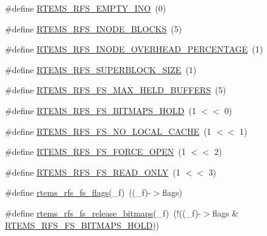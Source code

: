 \begin{DoxyCompactItemize}
\item 
\#define \mbox{\hyperlink{rtems-rfs-file-system_8h_a957363cf7a6021ba9f30143f5651c017}{R\+T\+E\+M\+S\+\_\+\+R\+F\+S\+\_\+\+E\+M\+P\+T\+Y\+\_\+\+I\+NO}}~(0)
\item 
\#define \mbox{\hyperlink{rtems-rfs-file-system_8h_a89ff31e716c58b51c65d688662acb012}{R\+T\+E\+M\+S\+\_\+\+R\+F\+S\+\_\+\+I\+N\+O\+D\+E\+\_\+\+B\+L\+O\+C\+KS}}~(5)
\item 
\#define \mbox{\hyperlink{rtems-rfs-file-system_8h_a2bb882abaa5cc3e88d60021646724e90}{R\+T\+E\+M\+S\+\_\+\+R\+F\+S\+\_\+\+I\+N\+O\+D\+E\+\_\+\+O\+V\+E\+R\+H\+E\+A\+D\+\_\+\+P\+E\+R\+C\+E\+N\+T\+A\+GE}}~(1)
\item 
\#define \mbox{\hyperlink{rtems-rfs-file-system_8h_a38fda827e3791d6dd1abab5f3a337f51}{R\+T\+E\+M\+S\+\_\+\+R\+F\+S\+\_\+\+S\+U\+P\+E\+R\+B\+L\+O\+C\+K\+\_\+\+S\+I\+ZE}}~(1)
\item 
\#define \mbox{\hyperlink{rtems-rfs-file-system_8h_a9fd0cd701de5912ac1e3a54a3ea3525f}{R\+T\+E\+M\+S\+\_\+\+R\+F\+S\+\_\+\+F\+S\+\_\+\+M\+A\+X\+\_\+\+H\+E\+L\+D\+\_\+\+B\+U\+F\+F\+E\+RS}}~(5)
\item 
\#define \mbox{\hyperlink{rtems-rfs-file-system_8h_a7b74db87d0962f9d81bbfd5d616664b8}{R\+T\+E\+M\+S\+\_\+\+R\+F\+S\+\_\+\+F\+S\+\_\+\+B\+I\+T\+M\+A\+P\+S\+\_\+\+H\+O\+LD}}~(1 $<$$<$ 0)
\item 
\#define \mbox{\hyperlink{rtems-rfs-file-system_8h_a4c09dc40dd68bed53db53bc05224e754}{R\+T\+E\+M\+S\+\_\+\+R\+F\+S\+\_\+\+F\+S\+\_\+\+N\+O\+\_\+\+L\+O\+C\+A\+L\+\_\+\+C\+A\+C\+HE}}~(1 $<$$<$ 1)
\item 
\#define \mbox{\hyperlink{rtems-rfs-file-system_8h_a89e9bcd11cdac2603617ffcb188a77e8}{R\+T\+E\+M\+S\+\_\+\+R\+F\+S\+\_\+\+F\+S\+\_\+\+F\+O\+R\+C\+E\+\_\+\+O\+P\+EN}}~(1 $<$$<$ 2)
\item 
\#define \mbox{\hyperlink{rtems-rfs-file-system_8h_aefbe25a7aea1d929a0743d3e71ef3a03}{R\+T\+E\+M\+S\+\_\+\+R\+F\+S\+\_\+\+F\+S\+\_\+\+R\+E\+A\+D\+\_\+\+O\+N\+LY}}~(1 $<$$<$ 3)
\item 
\#define \mbox{\hyperlink{rtems-rfs-file-system_8h_a9c000723c938133e303de702c51564e0}{rtems\+\_\+rfs\+\_\+fs\+\_\+flags}}(\+\_\+f)~((\+\_\+f)-\/$>$flags)
\item 
\#define \mbox{\hyperlink{rtems-rfs-file-system_8h_a4f9e28f9a48032957ac008a48cd7e22a}{rtems\+\_\+rfs\+\_\+fs\+\_\+release\+\_\+bitmaps}}(\+\_\+f)~(!((\+\_\+f)-\/$>$flags \& \mbox{\hyperlink{rtems-rfs-file-system_8h_a7b74db87d0962f9d81bbfd5d616664b8}{R\+T\+E\+M\+S\+\_\+\+R\+F\+S\+\_\+\+F\+S\+\_\+\+B\+I\+T\+M\+A\+P\+S\+\_\+\+H\+O\+LD}}))

\end{DoxyCompactItemize}
